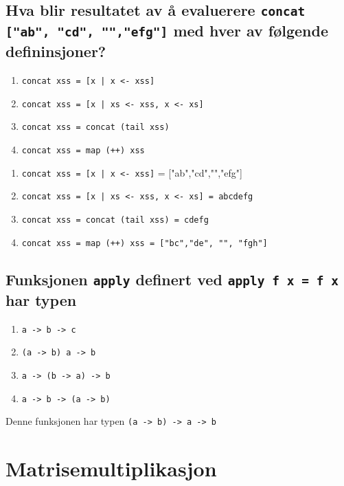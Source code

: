 \documentclass{article}
\begin{document}
    \subsection{Hva blir resultatet av å evaluerere \texttt{concat ["ab", "cd", "","efg"]} med hver av følgende defininsjoner?}

    \begin{enumerate}[label=\alph*)]
        \item \texttt{concat xss = [x | x <- xss]}
        \item \texttt{concat xss = [x | xs <- xss, x <- xs]}
        \item \texttt{concat xss = concat (tail xss)}
        \item \texttt{concat xss = map (++) xss}
    \end{enumerate}

    \begin{ans}
    \begin{enumerate}[label=\alph*)]
        \item \texttt{concat xss = [x | x <- xss]} = ["ab","cd","","efg"] 
        \item \texttt{concat xss = [x | xs <- xss, x <- xs] = abcdefg}
        \item \texttt{concat xss = concat (tail xss) = cdefg}
        \item \texttt{concat xss = map (++) xss = ["bc","de", "", "fgh"]}
    \end{enumerate}
    \end{ans}

    \subsection{Funksjonen \texttt{apply} definert ved \texttt{apply f x = f x} har typen}
    \begin{enumerate}[label=\alph*)]
        \item \texttt{a -> b -> c}
        \item \texttt{(a -> b) a -> b}
        \item \texttt{a -> (b -> a) -> b}
        \item \texttt{a -> b -> (a -> b)}
    \end{enumerate}

    \begin{ans}
        Denne funksjonen har typen \texttt{(a -> b) -> a -> b}
    \end{ans}

    \section{Matrisemultiplikasjon}
\end{document}
